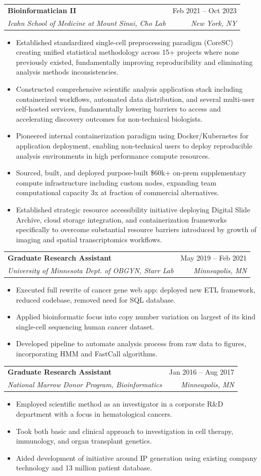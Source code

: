 \documentclass[letterpaper,10]{article}
\makeatletter
\newcommand{\resumeItem}[1]{
  \item\small{
    {#1 \vspace{-2pt}}
  }
}
\newcommand{\resumeSubheading}[4]{
  \vspace{-2pt}\item
    \begin{tabular*}{0.97\textwidth}[t]{l@{\extracolsep{\fill}}r}
      \textbf{#1} & #2 \\
      \textit{\small#3} & \textit{\small #4} \\
    \end{tabular*}\vspace{-7pt}
}
\newcommand{\resumeItemListStart}{\begin{itemize}}
\newcommand{\resumeItemListEnd}{\end{itemize}\vspace{-5pt}}
\makeatother
\begin{document}
    \resumeSubheading
      {Bioinformatician II}{Feb 2021 -- Oct 2023}
      {Icahn School of Medicine at Mount Sinai, Cho Lab}{New York, NY}
      \resumeItemListStart
        \resumeItem{Established standardized single-cell preprocessing paradigm (CoreSC) creating unified statistical methodology across 15+ projects where none previously existed, fundamentally improving reproducibility and eliminating analysis methods inconsistencies.}
        \resumeItem{Constructed comprehensive scientific analysis application stack including containerized workflows, automated data distribution, and several multi-user self-hosted services, fundamentally lowering barriers to access and accelerating discovery outcomes for non-technical biologists.}
        \resumeItem{Pioneered internal containerization paradigm using Docker/Kubernetes for application deployment, enabling non-technical users to deploy reproducible analysis environments in high performance compute resources.}
        \resumeItem{Sourced, built, and deployed purpose-built \$60k+ on-prem supplementary compute infrastructure including custom nodes, expanding team computational capacity 3x at fraction of commercial alternatives.}
        \resumeItem{Established strategic resource accessibility initiative deploying Digital Slide Archive, cloud storage integration, and containerization frameworks specifically to overcome substantial resource barriers introduced by growth of imaging and spatial transcriptomics workflows.}
      \resumeItemListEnd

    \resumeSubheading
      {Graduate Research Assistant}{May 2019 -- Feb 2021}
      {University of Minnesota Dept. of OBGYN, Starr Lab}{Minneapolis, MN}
      \resumeItemListStart
        \resumeItem{Executed full rewrite of cancer gene web app: deployed new ETL framework, reduced codebase, removed need for SQL database.}
        \resumeItem{Applied bioinformatic focus into copy number variation on largest of its kind single-cell sequencing human cancer dataset.}
        \resumeItem{Developed pipeline to automate analysis process from raw data to figures, incorporating HMM and FastCall algorithms.}
      \resumeItemListEnd

    \resumeSubheading
      {Graduate Research Assistant}{Jan 2016 -- Aug 2017}
      {National Marrow Donor Program, Bioinformatics}{Minneapolis, MN}
      \resumeItemListStart
        \resumeItem{Employed scientific method as an investigator in a corporate R\&D department with a focus in hematological cancers.}
        \resumeItem{Took both basic and clinical approach to investigation in cell therapy, immunology, and organ transplant genetics.}
        \resumeItem{Aided development of initiative around IP generation using existing company technology and 13 million patient database.}
      \resumeItemListEnd
\end{document}
